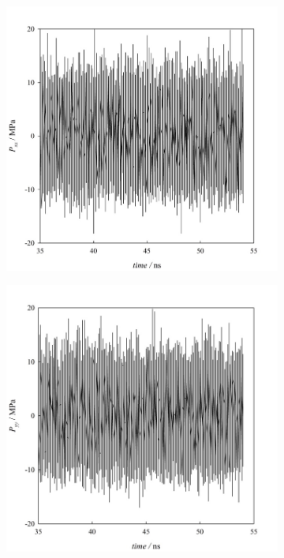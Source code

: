 \documentclass{scrbook}
\begin{document}
\begin{figure}
	\centering
	\begin{subfigure}{0.4\textwidth} %
    \includegraphics[width=1\textwidth]{gfx/image56.jpeg}
	\end{subfigure}
	\begin{subfigure}{0.4\textwidth} %
    \includegraphics[width=1\textwidth]{gfx/image57.jpeg}

\end{subfigure}
\end{figure}
\end{document}
